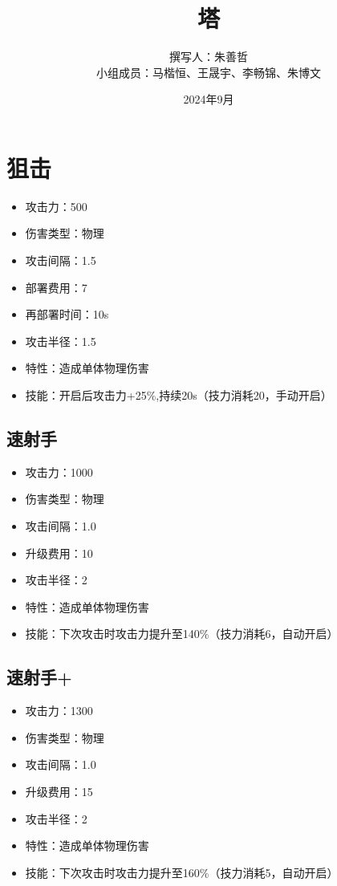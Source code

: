 \documentclass[a4paper,12pt]{article}
\begin{document}
	\title{塔}
	\author{撰写人：朱善哲\\小组成员：马楷恒、王晟宇、李畅锦、朱博文}
	\date{2024年9月}
	\maketitle
	\section{狙击}
		\begin{itemize}
			\item 攻击力：500
			\item 伤害类型：物理
			\item 攻击间隔：1.5
			\item 部署费用：7
			\item 再部署时间：10s
			\item 攻击半径：1.5
			\item 特性：造成单体物理伤害
			\item 技能：开启后攻击力+25\%,持续20s（技力消耗20，手动开启）
		\end{itemize}
		\subsection{速射手}
			\begin{itemize}
				\item 攻击力：1000
				\item 伤害类型：物理
				\item 攻击间隔：1.0
				\item 升级费用：10
				\item 攻击半径：2
				\item 特性：造成单体物理伤害
				\item 技能：下次攻击时攻击力提升至140\%（技力消耗6，自动开启）
			\end{itemize}
		\subsection{速射手+}
			\begin{itemize}
				\item 攻击力：1300
				\item 伤害类型：物理
				\item 攻击间隔：1.0
				\item 升级费用：15
				\item 攻击半径：2
				\item 特性：造成单体物理伤害
				\item 技能：下次攻击时攻击力提升至160\%（技力消耗5，自动开启）
			\end{itemize}
\end{document}
